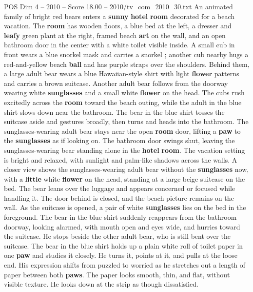 \begin{textsample}{POS Dim 4 – 2010 – Score 18.00 – 2010/tv\_com\_2010\_30.txt}  \label{ex:f4_pos_026}
An animated family of bright red bears enters a \textbf{sunny} \textbf{hotel} \textbf{room} decorated for a beach vacation.
The \textbf{room} has wooden floors, a blue bed at the left, a dresser and \textbf{leafy} green plant at the right, framed beach \textbf{art} on the wall, and an open bathroom door in the center with a white toilet visible inside.
A small cub in front wears a blue snorkel mask and carries a snorkel ; another cub nearby hugs a red-and-yellow beach \textbf{ball} and has purple straps over the shoulders.
Behind them, a large adult bear wears a blue Hawaiian-style shirt with light \textbf{flower} patterns and carries a brown suitcase.
Another adult bear follows from the doorway wearing white \textbf{sunglasses} and a small white \textbf{flower} on the head.
The cubs rush excitedly across the \textbf{room} toward the beach outing, while the adult in the blue shirt slows down near the bathroom.
The bear in the blue shirt tosses the suitcase aside and gestures broadly, then turns and heads into the bathroom.
The sunglasses-wearing adult bear stays near the open \textbf{room} door, lifting a \textbf{paw} to the \textbf{sunglasses} as if looking on.
The bathroom door swings shut, leaving the sunglasses-wearing bear standing alone in the \textbf{hotel} \textbf{room}.
The vacation setting is bright and relaxed, with sunlight and palm-like shadows across the walls.
A closer view shows the sunglasses-wearing adult bear without the \textbf{sunglasses} now, with a \textbf{little} white \textbf{flower} on the head, standing at a large beige suitcase on the bed.
The bear leans over the luggage and appears concerned or focused while handling it.
The door behind is closed, and the beach picture remains on the wall.
As the suitcase is opened, a pair of white \textbf{sunglasses} lies on the bed in the foreground.
The bear in the blue shirt suddenly reappears from the bathroom doorway, looking alarmed, with mouth open and eyes wide, and hurries toward the suitcase.
He stops beside the other adult bear, who is still bent over the suitcase.
The bear in the blue shirt holds up a plain white roll of toilet paper in one \textbf{paw} and studies it closely.
He turns it, points at it, and pulls at the loose end.
His expression shifts from puzzled to worried as he stretches out a length of paper between both \textbf{paws}.
The paper looks smooth, thin, and flat, without visible texture.
He looks down at the strip as though dissatisfied.

\end{textsample}
